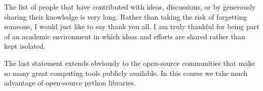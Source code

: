\documentclass[%
oneside,                 %
final,                   %
10pt]{article}
\begin{document}
\noindent
The list of people that have contributed with ideas, discussions, or by generously sharing their knowledge is very long. Rather than taking the risk of forgetting someone, I would just like to say thank you all. I am truly thankful for being part of an academic environment in which ideas and efforts are shared rather than kept isolated.

The last statement extends obviously to the open-source communities that make so many great computing tools publicly available. In this course we take much advantage of open-source python libraries.  


\end{document}
